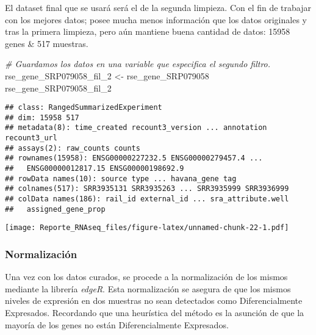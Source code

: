 \documentclass[
]{article}
\newenvironment{Shaded}{\begin{snugshade}}{\end{snugshade}}
\newcommand{\CommentTok}[1]{\textcolor[rgb]{0.56,0.35,0.01}{\textit{#1}}}
\newcommand{\FunctionTok}[1]{\textcolor[rgb]{0.00,0.00,0.00}{#1}}
\newcommand{\NormalTok}[1]{#1}
\newcommand{\OtherTok}[1]{\textcolor[rgb]{0.56,0.35,0.01}{#1}}
\newcommand{\SpecialCharTok}[1]{\textcolor[rgb]{0.00,0.00,0.00}{#1}}
\begin{document}
El dataset final que se usará será el de la segunda limpieza. Con el fin
de trabajar con los mejores datos; posee mucha menos información que los
datos originales y tras la primera limpieza, pero aún mantiene buena
cantidad de datos: 15958 genes \& 517 muestras.

\begin{Shaded}
\begin{Highlighting}[]
\CommentTok{\# Guardamos los datos en una variable que especifica el segundo filtro.}
\NormalTok{rse\_gene\_SRP079058\_fil\_2 }\OtherTok{\textless{}{-}}\NormalTok{ rse\_gene\_SRP079058}
\NormalTok{rse\_gene\_SRP079058\_fil\_2}
\end{Highlighting}
\end{Shaded}

\begin{verbatim}
## class: RangedSummarizedExperiment 
## dim: 15958 517 
## metadata(8): time_created recount3_version ... annotation recount3_url
## assays(2): raw_counts counts
## rownames(15958): ENSG00000227232.5 ENSG00000279457.4 ...
##   ENSG00000012817.15 ENSG00000198692.9
## rowData names(10): source type ... havana_gene tag
## colnames(517): SRR3935131 SRR3935263 ... SRR3935999 SRR3936999
## colData names(186): rail_id external_id ... sra_attribute.well
##   assigned_gene_prop
\end{verbatim}

\begin{Shaded}
\end{Shaded}

\texttt{[image: Reporte\_RNAseq\_files/figure-latex/unnamed-chunk-22-1.pdf]}

\hypertarget{normalizaciuxf3n}{%
\subsubsection{Normalización}\label{normalizaciuxf3n}}

Una vez con los datos curados, se procede a la normalización de los
mismos mediante la librería \emph{edgeR}. Esta normalización se asegura
de que los mismos niveles de expresión en dos muestras no sean
detectados como Diferencialmente Expresados. Recordando que una
heurística del método es la asunción de que la mayoría de los genes no
están Diferencialmente Expresados.
\end{document}
